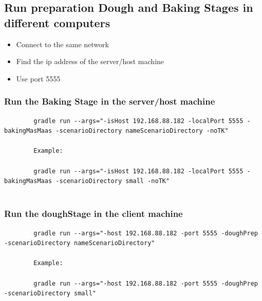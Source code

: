 \documentclass[paper=a4, fontsize=11pt]{scrartcl}
\begin{document}
	\subsection{Run preparation Dough and Baking Stages in different computers}
	
	\begin{itemize}
		\item Connect to the same network
		\item Find the ip address of the server/host machine
		\item Use port 5555
	\end{itemize}

	\subsubsection*{Run the Baking Stage in the server/host machine}
	
	\begin{lstlisting}
		gradle run --args="-isHost 192.168.88.182 -localPort 5555 -bakingMasMaas -scenarioDirectory nameScenarioDirectory -noTK"
		
		Example:
		
		gradle run --args="-isHost 192.168.88.182 -localPort 5555 -bakingMasMaas -scenarioDirectory small -noTK"
		
	\end{lstlisting}
	
	
	
	\subsubsection*{Run the doughStage in the client machine}
	
	\begin{lstlisting}
		gradle run --args="-host 192.168.88.182 -port 5555 -doughPrep -scenarioDirectory nameScenarioDirectory"
		
		Example:
		
		gradle run --args="-host 192.168.88.182 -port 5555 -doughPrep -scenarioDirectory small"
		
		
	\end{lstlisting}
	
	

		{}
		
		
	
	
\end{document}
